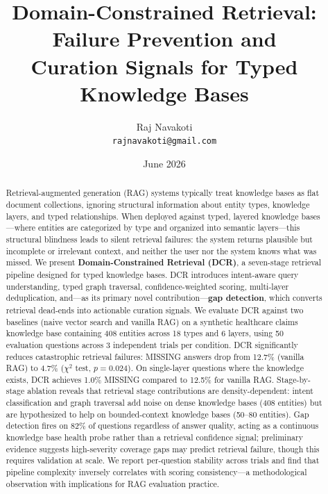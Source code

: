 \documentclass[11pt,a4paper]{article}
\title{\textbf{Domain-Constrained Retrieval: Failure Prevention and\\Curation Signals for Typed Knowledge Bases}}
\author{
  Raj Navakoti \\
  \texttt{rajnavakoti@gmail.com}
}
\date{June 2026}
\begin{document}
\maketitle

\begin{abstract}
Retrieval-augmented generation (RAG) systems typically treat knowledge bases as flat document collections, ignoring structural information about entity types, knowledge layers, and typed relationships. When deployed against typed, layered knowledge bases---where entities are categorized by type and organized into semantic layers---this structural blindness leads to silent retrieval failures: the system returns plausible but incomplete or irrelevant context, and neither the user nor the system knows what was missed. We present \textbf{Domain-Constrained Retrieval (DCR)}, a seven-stage retrieval pipeline designed for typed knowledge bases. DCR introduces intent-aware query understanding, typed graph traversal, confidence-weighted scoring, multi-layer deduplication, and---as its primary novel contribution---\textbf{gap detection}, which converts retrieval dead-ends into actionable curation signals. We evaluate DCR against two baselines (naive vector search and vanilla RAG) on a synthetic healthcare claims knowledge base containing 408 entities across 18 types and 6 layers, using 50 evaluation questions across 3 independent trials per condition. DCR significantly reduces catastrophic retrieval failures: MISSING answers drop from 12.7\% (vanilla RAG) to 4.7\% ($\chi^2$ test, $p = 0.024$). On single-layer questions where the knowledge exists, DCR achieves 1.0\% MISSING compared to 12.5\% for vanilla RAG. Stage-by-stage ablation reveals that retrieval stage contributions are density-dependent: intent classification and graph traversal add noise on dense knowledge bases (408 entities) but are hypothesized to help on bounded-context knowledge bases (50--80 entities). Gap detection fires on 82\% of questions regardless of answer quality, acting as a continuous knowledge base health probe rather than a retrieval confidence signal; preliminary evidence suggests high-severity coverage gaps may predict retrieval failure, though this requires validation at scale. We report per-question stability across trials and find that pipeline complexity inversely correlates with scoring consistency---a methodological observation with implications for RAG evaluation practice.
\end{abstract}
\end{document}
